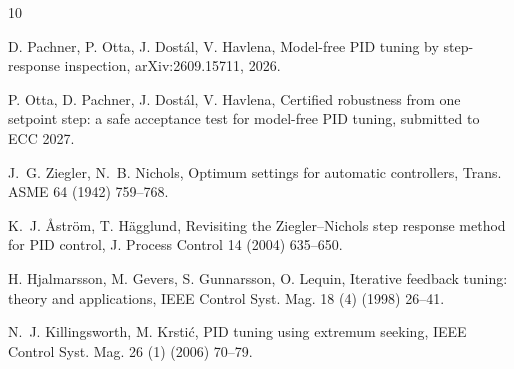 \documentclass[letterpaper, 10 pt, conference]{ieeeconf}
\begin{document}
\footnotesize
\begin{thebibliography}{10}
\setlength{\itemsep}{-1pt}

D. Pachner, P. Otta, J. Dost\'al, V. Havlena, Model-free PID tuning by
step-response inspection, arXiv:2609.15711, 2026.

P. Otta, D. Pachner, J. Dost\'al, V. Havlena, Certified robustness from one
setpoint step: a safe acceptance test for model-free PID tuning, submitted
to ECC 2027.

J.~G. Ziegler, N.~B. Nichols, Optimum settings for automatic controllers,
Trans. ASME 64 (1942) 759--768.

K.~J. {\AA}str{\"o}m, T. H{\"a}gglund, Revisiting the Ziegler--Nichols
step response method for PID control, J. Process Control 14 (2004) 635--650.

H. Hjalmarsson, M. Gevers, S. Gunnarsson, O. Lequin, Iterative feedback
tuning: theory and applications, IEEE Control Syst. Mag. 18 (4) (1998)
26--41.

N.~J. Killingsworth, M. Krsti{\'c}, PID tuning using extremum seeking,
IEEE Control Syst. Mag. 26 (1) (2006) 70--79.

\end{thebibliography}
\end{document}

